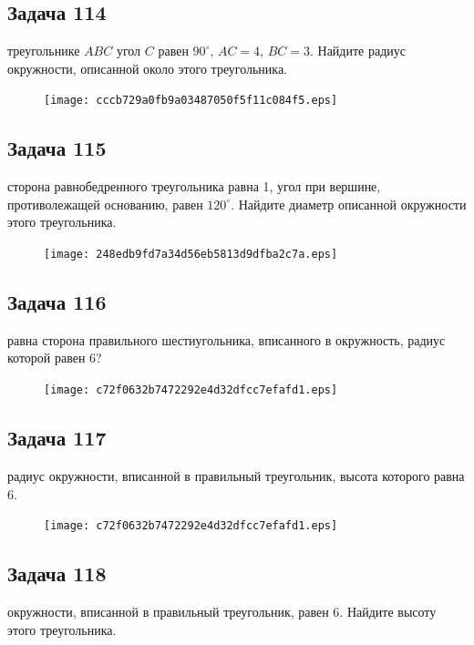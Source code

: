 \documentclass[a4paper,10pt]{article} %
\begin{document}
\begin{spacing}{1.0}
{\subsection*{Задача 114}
 треугольнике $ABC$ угол $C$ равен $90^\circ$, ${AC=4}$, ${BC=3}$. Найдите радиус окружности, описанной около этого треугольника.

\vspace{1.5cm}

\begin{figure}{\texttt{[image: cccb729a0fb9a03487050f5f11c084f5.eps]}}\end{figure}
\subsection*{Задача 115}
 сторона равнобедренного треугольника равна 1, угол при вершине, противолежащей основанию, равен $120^\circ$. Найдите диаметр описанной окружности этого треугольника.

\vspace{1.5cm}

\begin{figure}{\texttt{[image: 248edb9fd7a34d56eb5813d9dfba2c7a.eps]}}\end{figure}
\subsection*{Задача 116}
 равна сторона правильного шестиугольника, вписанного в окружность, радиус которой равен 6?

\vspace{1.5cm}

\begin{figure}{\texttt{[image: c72f0632b7472292e4d32dfcc7efafd1.eps]}}\end{figure}
\subsection*{Задача 117}
 радиус окружности, вписанной в правильный треугольник, высота которого равна 6.

\vspace{1.5cm}

\begin{figure}{\texttt{[image: c72f0632b7472292e4d32dfcc7efafd1.eps]}}\end{figure}
\subsection*{Задача 118}
 окружности, вписанной в правильный треугольник, равен 6. Найдите высоту этого треугольника.

}
\end{spacing}
\end{document}
